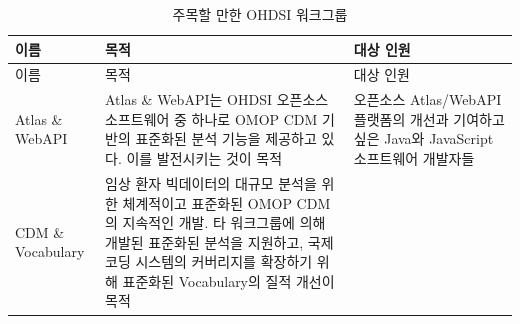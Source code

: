 \documentclass[10.5pt]{book}
\theoremstyle{definition}
\theoremstyle{definition}
\theoremstyle{definition}
\theoremstyle{remark}
\begin{document}
\begin{longtable}[]{@{}lll@{}}
\caption{\label{tab:OHDSIworkgroups} 주목할 만한 OHDSI
워크그룹}\tabularnewline
\toprule
\begin{minipage}[b]{0.11\columnwidth}\raggedright\strut
이름\strut
\end{minipage} & \begin{minipage}[b]{0.44\columnwidth}\raggedright\strut
목적\strut
\end{minipage} & \begin{minipage}[b]{0.37\columnwidth}\raggedright\strut
대상 인원\strut
\end{minipage}\tabularnewline
\midrule
\endfirsthead
\toprule
\begin{minipage}[b]{0.11\columnwidth}\raggedright\strut
이름\strut
\end{minipage} & \begin{minipage}[b]{0.44\columnwidth}\raggedright\strut
목적\strut
\end{minipage} & \begin{minipage}[b]{0.37\columnwidth}\raggedright\strut
대상 인원\strut
\end{minipage}\tabularnewline
\midrule
\endhead
\begin{minipage}[t]{0.11\columnwidth}\raggedright\strut
Atlas \& WebAPI\strut
\end{minipage} & \begin{minipage}[t]{0.44\columnwidth}\raggedright\strut
Atlas \& WebAPI는 OHDSI 오픈소스 소프트웨어 중 하나로 OMOP CDM 기반의
표준화된 분석 기능을 제공하고 있다. 이를 발전시키는 것이 목적\strut
\end{minipage} & \begin{minipage}[t]{0.37\columnwidth}\raggedright\strut
오픈소스 Atlas/WebAPI 플랫폼의 개선과 기여하고 싶은 Java와 JavaScript
소프트웨어 개발자들\strut
\end{minipage}\tabularnewline
\begin{minipage}[t]{0.11\columnwidth}\raggedright\strut
CDM \& Vocabulary\strut
\end{minipage} & \begin{minipage}[t]{0.44\columnwidth}\raggedright\strut
임상 환자 빅데이터의 대규모 분석을 위한 체계적이고 표준화된 OMOP CDM의
지속적인 개발. 타 워크그룹에 의해 개발된 표준화된 분석을 지원하고, 국제
코딩 시스템의 커버리지를 확장하기 위해 표준화된 Vocabulary의 질적 개선이
목적\strut
\end{minipage} & \begin{minipage}[t]{0.37\columnwidth}\raggedright\strut

\end{minipage}
\end{longtable}
\end{document}
